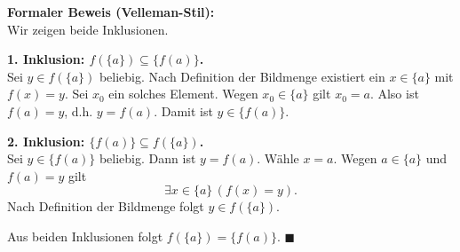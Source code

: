 \documentclass[11pt,a4paper]{article}
\begin{document}
\begin{proofbox}
\textbf{Formaler Beweis (Velleman-Stil):}\\
Wir zeigen beide Inklusionen.

\medskip
\noindent\textbf{1. Inklusion: \(f(\{a\}) \subseteq \{f(a)\}\).}\\
Sei \(y \in f(\{a\})\) beliebig. Nach Definition der Bildmenge existiert ein \(x \in \{a\}\) mit \(f(x) = y\). Sei \(x_0\) ein solches Element. Wegen \(x_0 \in \{a\}\) gilt \(x_0 = a\). Also ist \(f(a) = y\), d.h. \(y = f(a)\). Damit ist \(y \in \{f(a)\}\).

\medskip
\noindent\textbf{2. Inklusion: \(\{f(a)\} \subseteq f(\{a\})\).}\\
Sei \(y \in \{f(a)\}\) beliebig. Dann ist \(y = f(a)\). Wähle \(x = a\). Wegen \(a \in \{a\}\) und \(f(a) = y\) gilt
\[
\exists x \in \{a\}\,(f(x) = y).
\]
Nach Definition der Bildmenge folgt \(y \in f(\{a\})\).

\medskip
Aus beiden Inklusionen folgt \(f(\{a\}) = \{f(a)\}\). \hfill \(\blacksquare\)
\end{proofbox}
\end{document}
